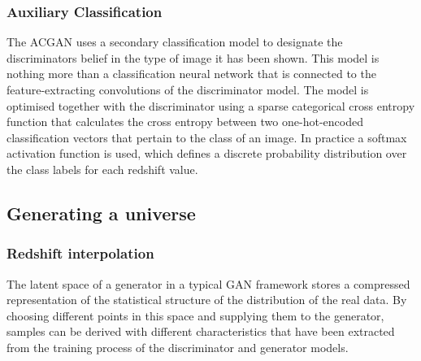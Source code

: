 \documentclass[twocolumn]{article}
\numberwithin{equation}{section}
\begin{document}
\subsubsection{Auxiliary Classification}
The ACGAN uses a secondary classification model to designate the discriminators belief in the type of image it has been 
shown. This model is nothing more than a classification neural network that is connected to the feature-extracting 
convolutions of the discriminator model. The model is optimised together with the discriminator using a sparse categorical
cross entropy function that calculates the cross entropy between two one-hot-encoded classification vectors that pertain 
to the class of an image. In practice a softmax activation function is used, which defines a discrete probability 
distribution over the class labels for each redshift value. 

\subsection{Generating a universe}


\subsubsection{Redshift interpolation}\label{methods:z_interp}
The latent space of a generator in a typical GAN framework stores a compressed representation of the statistical structure
of the distribution of the real data. By choosing different points in this space and supplying them to the generator, 
samples can be derived with different characteristics that have been extracted from the training process of the 
discriminator and generator models.
\end{document}
